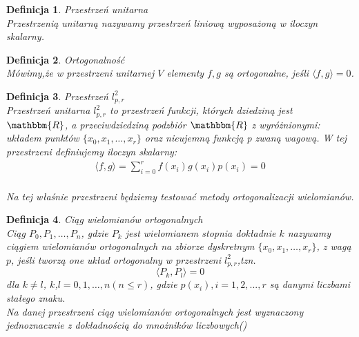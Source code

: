 \documentclass[12pt,wide]{mwart}
\newtheorem{defin}{Definicja}
\begin{document}
\begin{defin}{Przestrzeń unitarna}\\
Przestrzenią unitarną nazywamy przestrzeń liniową wyposażoną w iloczyn skalarny.
\end{defin}

\begin{defin}{Ortogonalność}\\
Mówimy,że w przestrzeni unitarnej $V$ elementy $f,g$ są ortogonalne, jeśli $\langle f,g \rangle = 0$. 
\end{defin}

\begin{defin}{Przestrzeń $l^2_{p,r}$}\\
Przestrzeń unitarna $l^2_{p,r}$ to przestrzeń funkcji, których dziedziną jest $\mathbbm{R}$, a przeciwdziedziną podzbiór $\mathbbm{R}$ z wyróżnionymi: układem punktów $\{x_0,x_1,\ldots,x_r\}$ oraz nieujemną funkcją p zwaną wagową. W tej przestrzeni definiujemy iloczyn skalarny:
\begin{eqnarray*}
	\langle  f,g \rangle = \sum^r_{i=0} f(x_i)g(x_i)p(x_i) = 0
\end{eqnarray*}\\
Na tej właśnie przestrzeni będziemy testować metody ortogonalizacji wielomianów.
\end{defin}

\begin{defin}{Ciąg wielomianów ortogonalnych}\\
Ciąg $P_0,P_1,\ldots,P_n$, gdzie $P_k$ jest wielomianem stopnia dokładnie $k$ nazywamy ciągiem wielomianów ortogonalnych na zbiorze dyskretnym $\{x_0,x_1,\ldots,x_r\}$, z wagą $p$, jeśli tworzą one układ ortogonalny w przestrzeni $l^2_{p,r}$,tzn.
$$
	\langle  P_k,P_l \rangle = 0
$$
dla $k \neq l$, $k$,$l = 0,1,\ldots,n ( n \leq r)$, gdzie $p(x_i), i = 1,2,...,r$ są danymi liczbami stałego znaku.\\
Na danej przestrzeni ciąg wielomianów ortogonalnych jest wyznaczony jednoznacznie z dokładnością do mnożników liczbowych(\cite[strona 93]{JMJ})
\end{defin}
\end{document}
